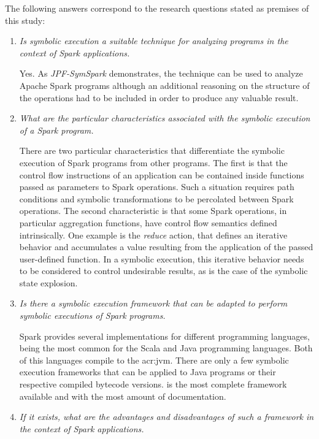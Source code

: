 The following answers correspond to the research questions stated as premises of this study:

\begin{enumerate}
	\item \textit{Is symbolic execution a suitable technique for analyzing programs in the context of Spark applications.} 
	
	Yes. As \textit{JPF-SymSpark} demonstrates, the technique can be used to analyze Apache Spark programs although an additional reasoning on the structure of the operations had to be included in order to produce any valuable result.
	
	\item \textit{What are the particular characteristics associated with the symbolic execution of a Spark program.}
	
	There are two particular characteristics that differentiate the symbolic execution of Spark programs from other programs. The first is that the control flow instructions of an application can be contained inside functions passed as parameters to Spark operations. Such a situation requires path conditions and symbolic transformations to be percolated between Spark operations. The second characteristic is that some Spark operations, in particular aggregation functions, have control flow semantics defined intrinsically. One example is the \textit{reduce} action, that defines an iterative behavior and accumulates a value resulting from the application of the passed user-defined function. In a symbolic execution, this iterative behavior needs to be considered to control undesirable results, as is the case of the symbolic state explosion.
	
	\item \textit{Is there a symbolic execution framework that can be adapted to perform symbolic executions of Spark programs.}
	
	Spark provides several implementations for different programming languages, being the most common for the Scala and Java programming languages. Both of this languages compile to the \acrlong{acr:jvm}. There are only a few symbolic execution frameworks that can be applied to Java programs or their respective compiled bytecode versions. \spf{} is the most complete framework available and with the most amount of documentation.
	
	\item \textit{If it exists, what are the advantages and disadvantages of such a framework in the context of Spark applications.}
	

\end{enumerate}
